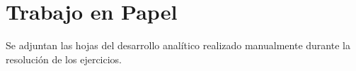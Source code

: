 \section{Trabajo en Papel}
\label{sec:ej1_anexo_papel}

Se adjuntan las hojas del desarrollo analítico realizado manualmente durante la resolución de los ejercicios.





